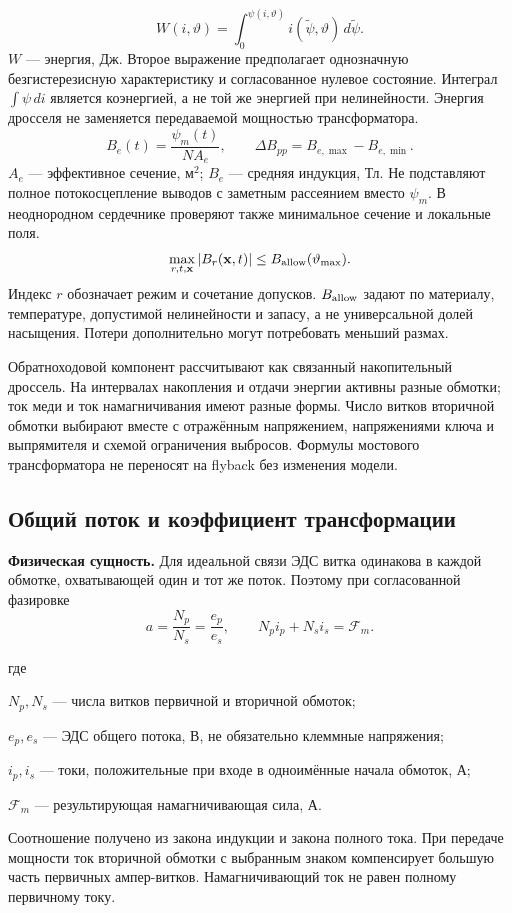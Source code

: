 \documentclass[14pt,a4paper]{extarticle}
\newcommand{\phys}{\par\noindent\textbf{Физическая сущность.} }
\newenvironment{whereblock}
 {\par\noindent где\par
  \begin{list}{}{\setlength{\leftmargin}{12.5mm}
                  \setlength{\itemindent}{-12.5mm}
                  \setlength{\itemsep}{0pt}
                  \setlength{\parsep}{0pt}
                  \setlength{\topsep}{0pt}}}
 {\end{list}}
\newcommand{\whereitem}[2]{\item[] #1 --- #2}
\begin{document}
\begin{equation}
 W(i,\vartheta)=\int_0^{\psi(i,\vartheta)}i(\widetilde\psi,\vartheta)\,d\widetilde\psi.
 \label{eq:energy-nonlinear}
\end{equation}
$W$ --- энергия, Дж. Второе выражение предполагает однозначную безгистерезисную характеристику и согласованное нулевое состояние. Интеграл $\int\psi\,di$ является коэнергией, а не той же энергией при нелинейности. Энергия дросселя не заменяется передаваемой мощностью трансформатора.\cite{web1,web35}
\begin{equation}
 B_e(t)=\frac{\psi_m(t)}{NA_e},\qquad
 \Delta B_{pp}=B_{e,\max}-B_{e,\min}.
 \label{eq:b-equivalent-trajectory}
\end{equation}
$A_e$ --- эффективное сечение, м$^2$; $B_e$ --- средняя индукция, Тл. Не подставляют полное потокосцепление выводов с заметным рассеянием вместо $\psi_m$. В неоднородном сердечнике проверяют также минимальное сечение и локальные поля.
\begin{equation}
 \max_{r,t,\mathbf x}|B_r(\mathbf x,t)|\leq B_{\rm allow}(\vartheta_{\max}).
 \label{eq:b-acceptance}
\end{equation}
Индекс $r$ обозначает режим и сочетание допусков. $B_{\rm allow}$ задают по материалу, температуре, допустимой нелинейности и запасу, а не универсальной долей насыщения. Потери дополнительно могут потребовать меньший размах.\cite{web3}


Обратноходовой компонент рассчитывают как связанный накопительный дроссель. На интервалах накопления и отдачи энергии активны разные обмотки; ток меди и ток намагничивания имеют разные формы. Число витков вторичной обмотки выбирают вместе с отражённым напряжением, напряжениями ключа и выпрямителя и схемой ограничения выбросов. Формулы мостового трансформатора не переносят на flyback без изменения модели.\cite{web35}

\subsection{Общий поток и коэффициент трансформации}
\phys Для идеальной связи ЭДС витка одинакова в каждой обмотке, охватывающей один и тот же поток. Поэтому при согласованной фазировке
\begin{equation}
 a=\frac{N_p}{N_s}=\frac{e_p}{e_s},\qquad
 N_p i_p+N_s i_s=\mathcal F_m .
 \label{pl:eq:ratio-mmf}
\end{equation}
\begin{whereblock}
\whereitem{$N_p,N_s$}{числа витков первичной и вторичной обмоток;}
\whereitem{$e_p,e_s$}{ЭДС общего потока, В, не обязательно клеммные напряжения;}
\whereitem{$i_p,i_s$}{токи, положительные при входе в одноимённые начала обмоток, А;}
\whereitem{$\mathcal F_m$}{результирующая намагничивающая сила, А.}
\end{whereblock}
Соотношение получено из закона индукции и закона полного тока. При передаче мощности ток вторичной обмотки с выбранным знаком компенсирует большую часть первичных ампер-витков. Намагничивающий ток не равен полному первичному току.\cite{web1}
\end{document}
